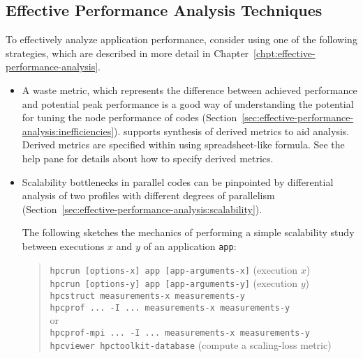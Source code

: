 \documentclass[11pt,twoside,letterpaper]{report}
\begin{document}

\subsection{Effective Performance Analysis Techniques}

To effectively analyze application performance, consider using one of the following strategies, which are described in more detail in Chapter~\ref{chpt:effective-performance-analysis}.
\begin{itemize}
\item
A waste metric, which represents the difference between achieved performance and potential peak performance is a good way of understanding the potential for tuning the node performance of codes (Section~\ref{sec:effective-performance-analysis:inefficiencies}).
\hpcviewer{} supports synthesis of derived metrics to aid analysis.
Derived metrics are specified within \hpcviewer{} using spreadsheet-like formula.
See the \hpcviewer{} help pane for details about how to specify derived metrics.

\item
Scalability bottlenecks in parallel codes can be pinpointed by differential analysis of two profiles with different degrees of parallelism (Section~\ref{sec:effective-performance-analysis:scalability}).

The following sketches the mechanics of performing a simple scalability study between executions $x$ and $y$ of an application \texttt{app}:
\begin{quote}
  \verb|hpcrun [options-x] app [app-arguments-x]| \hfill (execution $x$) \\
  \verb|hpcrun [options-y] app [app-arguments-y]| \hfill (execution $y$) \\
  \verb|hpcstruct measurements-x measurements-y| \\
  \verb|hpcprof ... -I ... measurements-x measurements-y| \\
		or \\
  \verb|hpcprof-mpi ... -I ... measurements-x measurements-y| \\
  \verb|hpcviewer hpctoolkit-database| \hfill (compute a scaling-loss metric)
\end{quote}

\end{itemize}


\end{document}
